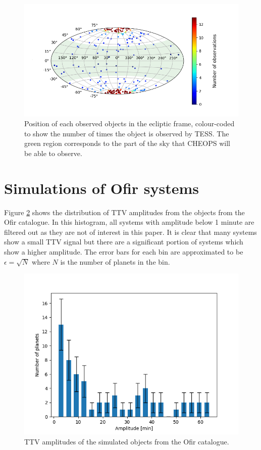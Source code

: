 \documentclass[12pt]{report}
\begin{document}
\begin{figure}[h!]
	\centering
	\includegraphics[width=\textwidth]{img/skymap_TESS_multi.png}
	  \caption{Position of each observed objects in the ecliptic frame, colour-coded to show the number of times the object is observed by TESS. The green region corresponds to the part of the sky that CHEOPS will be able to observe.}	
	  \label{fig:skymap_TESS}	
\end{figure}\newpage
\section{Simulations of Ofir systems}
	Figure \ref{fig:ampl_ofir} shows the distribution of TTV amplitudes from the objects from the Ofir catalogue. In this histogram, all systems with amplitude below 1 minute are filtered out as they are not of interest in this paper. It is clear that many systems show a small TTV signal but there are a significant portion of systems which show a higher amplitude. The error bars for each bin are approximated to be $\epsilon = \sqrt{N}$ where $N$ is the number of planets in the bin.
\begin{figure}
 	 \centering
	  \includegraphics[width=\textwidth]{img/ampl_ofir_66.png}
	  \caption{TTV amplitudes of the simulated objects from the Ofir catalogue.}
	 \label{fig:ampl_ofir}
\end{figure}  
\end{document}
